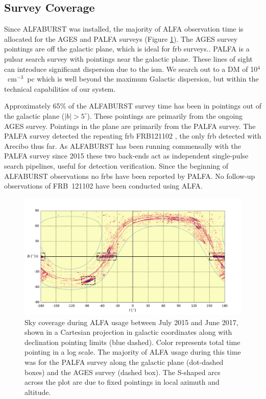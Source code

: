 \documentclass[a4paper,fleqn,usenatbib]{mnras}
\begin{document}


\subsection{Survey Coverage}
\label{sec:survey_coverage}

Since ALFABURST was installed, the majority of ALFA observation time is
allocated for the AGES \citep{2006MNRAS.371.1617A} and PALFA
\citep{2006ApJ...637..446C} surveys (Figure \ref{fig:sky_coverage}).  The AGES
survey pointings are off the galactic plane, which is ideal for \gls{frb}
surveys.. PALFA is a pulsar search survey with pointings near the galactic
plane. These lines of sight can introduce significant dispersion due to the
\gls{ism}. We search out to a DM of 10$^{4}$~cm$^{-3}$~pc which is well beyond
the maximum Galactic dispersion, but within the technical capabilities of our
system. 

Approximately 65\% of the ALFABURST survey time has been in pointings out of the
galactic plane ($|b| > 5^{\circ}$).  These pointings are primarily from the
ongoing AGES survey.  Pointings in the plane are primarily from the PALFA
survey.  The PALFA survey detected the repeating \gls{frb} FRB121102
\citep{2014ApJ...790..101S}, the only \gls{frb} detected with Arecibo thus far.
As ALFABURST has been running commensally with the PALFA survey since 2015 these
two back-ends act as independent single-pulse search pipelines, useful for
detection verification.  Since the beginning of ALFABURST observations no
\glspl{frb} have been reported by PALFA. No follow-up observations of FRB~121102
have been conducted using ALFA.

\begin{figure}
    \includegraphics[width=1.0\linewidth]{figures/cartview_sky_coverage.pdf}
    \caption{Sky coverage during ALFA usage between July 2015 and June 2017,
    shown in a Cartesian projection in galactic coordinates along with
    declination pointing limits (blue dashed). Color represents total time
    pointing in a log scale. The majority of ALFA usage during this time was for
    the PALFA survey along the galactic plane (dot-dashed boxes) and the AGES
    survey (dashed box).  The S-shaped arcs across the plot are due to fixed
    pointings in local azimuth and altitude.
    }
    \label{fig:sky_coverage}
\end{figure}
\end{document}
